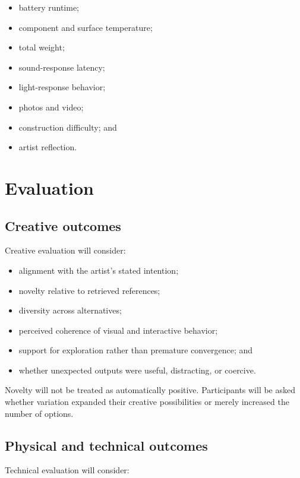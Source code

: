 \documentclass{article}
\begin{document}
\begin{itemize}[leftmargin=*]
    \item battery runtime;
    \item component and surface temperature;
    \item total weight;
    \item sound-response latency;
    \item light-response behavior;
    \item photos and video;
    \item construction difficulty; and
    \item artist reflection.
\end{itemize}

\section{Evaluation}

\subsection{Creative outcomes}

Creative evaluation will consider:

\begin{itemize}[leftmargin=*]
    \item alignment with the artist's stated intention;
    \item novelty relative to retrieved references;
    \item diversity across alternatives;
    \item perceived coherence of visual and interactive behavior;
    \item support for exploration rather than premature convergence; and
    \item whether unexpected outputs were useful, distracting, or coercive.
\end{itemize}

Novelty will not be treated as automatically positive. Participants will be
asked whether variation expanded their creative possibilities or merely
increased the number of options.

\subsection{Physical and technical outcomes}

Technical evaluation will consider:
\end{document}
